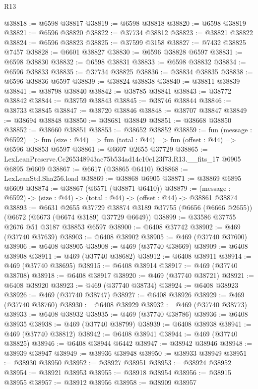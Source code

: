 \begin{lexlean}{R13}
\begin{coremodule}
@38818 := @6598 @38817
@38819 := @6598 @38818
@38820 := @6598 @38819
@38821 := @6596 @38820
@38822 := @37734 @38812
@38823 := @38821 @38822
@38824 := @6596 @38823
@38825 := @37599 @3158
@38827 := @7432 @38825 @7457
@38828 := @6601 @38827
@38830 := @6596 @38828 @6597
@38831 := @6598 @38830
@38832 := @6598 @38831
@38833 := @6598 @38832
@38834 := @6596 @38833
@38835 := @37734 @38825
@38836 := @38834 @38835
@38838 := @6596 @38836 @6597
@38839 := @38824 @38838
@38840 := @38811 @38839
@38841 := @38798 @38840
@38842 := @38785 @38841
@38843 := @38772 @38842
@38844 := @38759 @38843
@38845 := @38746 @38844
@38846 := @38733 @38845
@38847 := @38720 @38846
@38848 := @38707 @38847
@38849 := @38694 @38848
@38850 := @38681 @38849
@38851 := @38668 @38850
@38852 := @38660 @38851
@38853 := @38652 @38852
@38859 := fun (message : @6592) =>
  fun (size : @44) => fun (total : @44) => fun (offset : @44) => @6596 @38853 @6597
@38861 := @6607 @2655 @37729
@38865 := LexLeanPreserve.Cc265348943ac75b534ad14c10e123f73.R13.__fits_17 @6905 @6895 @6609
@38867 := @6617 (@38865 @6410)
@38868 := LexLeanStd.Sha256.load
@38869 := @38868 @6905
@38871 := @38869 @6895 @6609
@38874 := @38867 (@6571 (@38871 @6410))
@38879 := (message : @6592) -> (size : @44) -> (total : @44) -> (offset : @44) -> @38861 @38874
@38893 := @6631
    @2655
    @37729
    @38874
    @3189
    @37755
    (@6656 (@6666 @2655))
    (@6672 (@6673 (@6674 @3189) @37729 @6649))
@38899 := @33586 @37755 @2676 @51 @3187 @38853 @6597
@38900 := @6408 @37742
@38902 := @469 (@37740 @37639)
@38903 := @6408 @38902
@38905 := @469 (@37740 @37600)
@38906 := @6408 @38905
@38908 := @469 (@37740 @38669)
@38909 := @6408 @38908
@38911 := @469 (@37740 @38682)
@38912 := @6408 @38911
@38914 := @469 (@37740 @38695)
@38915 := @6408 @38914
@38917 := @469 (@37740 @38708)
@38918 := @6408 @38917
@38920 := @469 (@37740 @38721)
@38921 := @6408 @38920
@38923 := @469 (@37740 @38734)
@38924 := @6408 @38923
@38926 := @469 (@37740 @38747)
@38927 := @6408 @38926
@38929 := @469 (@37740 @38760)
@38930 := @6408 @38929
@38932 := @469 (@37740 @38773)
@38933 := @6408 @38932
@38935 := @469 (@37740 @38786)
@38936 := @6408 @38935
@38938 := @469 (@37740 @38799)
@38939 := @6408 @38938
@38941 := @469 (@37740 @38812)
@38942 := @6408 @38941
@38944 := @469 (@37740 @38825)
@38946 := @6408 @38944 @6442
@38947 := @38942 @38946
@38948 := @38939 @38947
@38949 := @38936 @38948
@38950 := @38933 @38949
@38951 := @38930 @38950
@38952 := @38927 @38951
@38953 := @38924 @38952
@38954 := @38921 @38953
@38955 := @38918 @38954
@38956 := @38915 @38955
@38957 := @38912 @38956
@38958 := @38909 @38957

\end{coremodule}
\end{lexlean}
